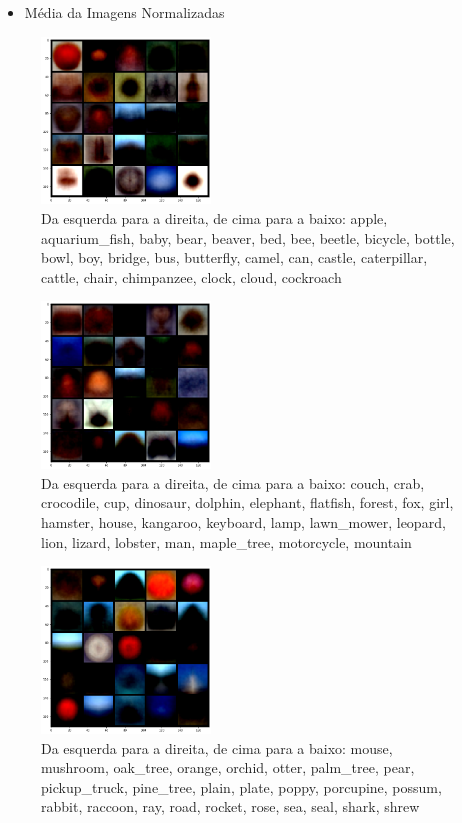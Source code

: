 \documentclass[conference]{IEEEtran}
\begin{document}
\begin{itemize}
\item Média da Imagens Normalizadas
\end{itemize}

\begin{figure}[H]
\centerline{\includegraphics[width=0.4\textwidth]{Images/img_mean_norm1.png}}
\caption{\label{fig:img_mean_norm1}Da esquerda para a direita, de cima para a baixo: apple, aquarium\_fish, baby, bear, beaver, bed, bee, beetle, bicycle, bottle, bowl, boy, bridge, bus, butterfly, camel, can, castle, caterpillar, cattle, chair, chimpanzee, clock, cloud, cockroach}
\end{figure}

\begin{figure}[H]
\centerline{\includegraphics[width=0.4\textwidth]{Images/img_mean_norm2.png}}
\caption{\label{fig:img_mean_norm2}Da esquerda para a direita, de cima para a baixo: couch, crab, crocodile, cup, dinosaur, dolphin, elephant, flatfish, forest, fox, girl, hamster, house, kangaroo, keyboard, lamp, lawn\_mower, leopard, lion, lizard, lobster, man, maple\_tree, motorcycle, mountain}
\end{figure}

\begin{figure}[H]
\centerline{\includegraphics[width=0.4\textwidth]{Images/img_mean_norm3.png}}
\caption{\label{fig:img_mean_norm3}Da esquerda para a direita, de cima para a baixo: mouse, mushroom, oak\_tree, orange, orchid, otter, palm\_tree, pear, pickup\_truck, pine\_tree, plain, plate, poppy, porcupine, possum, rabbit, raccoon, ray, road, rocket, rose, sea, seal, shark, shrew}
\end{figure}
\end{document}
